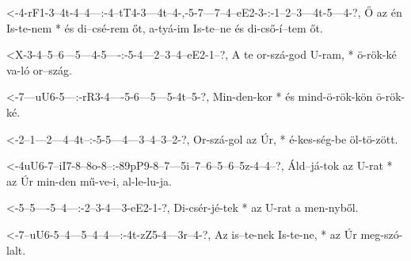 


  {<-4-rF1-3--4t-4--4---:-4--tT4-3---4t--4-,-5-7---7--4--eE2-3-:-1--2--3---4t-5---4-?,}
  {  Ő az  én Is-te-nem * és di--csé-rem őt, a-tyá-im Is-te--ne  és di-cső-í--tem őt.}

  {<X-3-4--5--6---5---4-5----:-5-4---2--3--4--eE2-1--?,}
  {   A te or-szá-god U-ram, * ö-rök-ké va-ló or--szág.}

  {<-7---uU6-5---:-rR3-4----5-6---5---5-4t--5-?,}
  {  Min-den-kor * és  mind-ö-rök-kön ö-rök-ké.}



  {<-2--1---2---4--4t--:-5-5---4---3--4--3--2-?,}
  {  Or-szá-gol az Úr, * é-kes-ség-be öl-tö-zött.}

  {<-4uU6-7--iI7-8--8o-8--:-89pP9-8--7---5i--7--6--5--6--5z-4--4--?,}
  {  Áld--já-tok az U-rat * az    Úr min-den mű-ve-i, al-le-lu-ja.}

  {<-5--5----5--4---:-2--3-4---3-eE2-1-?,}
  {  Di-csér-jé-tek * az U-rat a men-nyből.}




  {<-7--uU6-5--4---5--4--4---:-4t-zZ5-4---3r--4-?,}
  {  Az is--te-nek Is-te-ne, * az Úr  meg-szó-lalt.}

